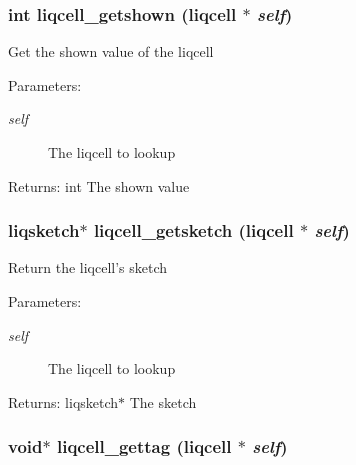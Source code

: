 \subsubsection[{liqcell\_\-getshown}]{\setlength{\rightskip}{0pt plus 5cm}int liqcell\_\-getshown (liqcell $\ast$ {\em self})}\label{d5/da2/liqcell_8c_c9cdeee7b2d86ecae2fff7f9cafa1e89}


Get the shown value of the liqcell \begin{Desc}
\item[Parameters:]
\begin{description}
\item[{\em self}]The liqcell to lookup \end{description}
\end{Desc}
\begin{Desc}
\item[Returns:]int The shown value \end{Desc}
\subsubsection[{liqcell\_\-getsketch}]{\setlength{\rightskip}{0pt plus 5cm}liqsketch$\ast$ liqcell\_\-getsketch (liqcell $\ast$ {\em self})}\label{d5/da2/liqcell_8c_2657173c159673ce98822085c34aa78e}


Return the liqcell's sketch \begin{Desc}
\item[Parameters:]
\begin{description}
\item[{\em self}]The liqcell to lookup \end{description}
\end{Desc}
\begin{Desc}
\item[Returns:]liqsketch$\ast$ The sketch \end{Desc}
\subsubsection[{liqcell\_\-gettag}]{\setlength{\rightskip}{0pt plus 5cm}void$\ast$ liqcell\_\-gettag (liqcell $\ast$ {\em self})}\label{d5/da2/liqcell_8c_7955aea284456771a26a189e944a73d8}


